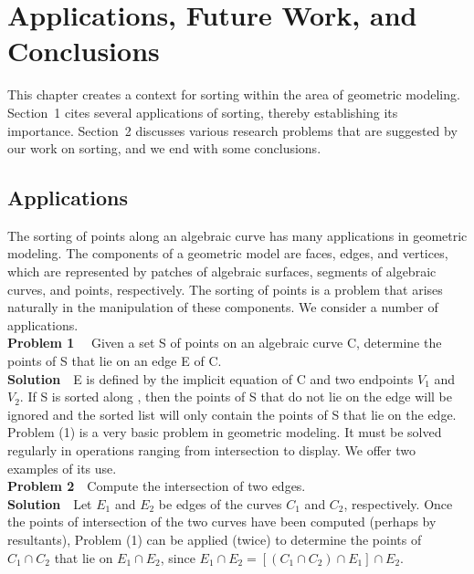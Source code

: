 \chapter{Applications, Future Work, and Conclusions}
\label{chap-5}

This chapter creates a context for sorting within
the area of geometric modeling.
Section~1 cites several applications of sorting, thereby
establishing its importance.
Section~2 discusses various research problems that are suggested
by our work on sorting, and
we end with some conclusions.
\section{Applications}

The sorting of points along an algebraic curve has many applications 
in geometric modeling.
The components of a geometric model are faces, edges, and vertices, which
are represented by patches of algebraic surfaces, segments of algebraic
curves, and points, respectively.
The sorting of points is a problem that arises naturally in the
manipulation of these components.
We consider a number of\vspace{.5in} applications.\\
%
{\bf Problem 1}
\ \ Given 
a set S of points on an algebraic curve C, determine the points of
S that lie on an edge E of C.\\
{\bf Solution}\ \ 
E is defined by the implicit equation of C 
and two endpoints $V_{1}$ and $V_{2}$.
If S is sorted along , then the points of S that
do not lie on the edge will be ignored and the sorted list will only
contain the points of S that lie on the \vspace{.5in}edge.\\
Problem (1) is a very basic problem in geometric modeling.
It must be solved regularly in operations ranging from intersection to
display.
We offer two examples of its use.\\
{\bf Problem 2}\ \  
Compute the intersection of two edges.\\
{\bf Solution}\ \ Let $E_{1}$ and $E_{2}$ be edges of the curves
$C_{1}$ and $C_{2}$, respectively.
Once the points of intersection of the two curves have been computed (perhaps
by resultants), Problem (1) can be applied (twice) to determine 
the points 
of $C_{1} \cap C_{2}$ that lie on $E_{1} \cap E_{2}$, since\vspace{.5in}
\mbox{$E_{1} \cap E_{2} = [(C_{1} \cap C_{2}) \cap E_{1}] \cap E_{2} $.}\\
